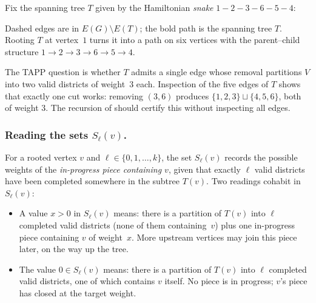 \documentclass[11pt]{article}
\begin{document}
Fix the spanning tree $T$ given by the Hamiltonian \emph{snake}
$1{-}2{-}3{-}6{-}5{-}4$:

\begin{center}
\end{center}

\noindent Dashed edges are in $E(G) \setminus E(T)$; the bold path is
the spanning tree $T$. Rooting $T$ at vertex~$1$ turns it into a path
on six vertices with the parent--child structure
$1 \to 2 \to 3 \to 6 \to 5 \to 4$.

The TAPP question is whether $T$ admits a single edge whose removal
partitions $V$ into two valid districts of weight~$3$ each. Inspection
of the five edges of $T$ shows that exactly one cut works: removing
$(3,6)$ produces $\{1,2,3\} \sqcup \{4,5,6\}$, both of weight $3$. The
recursion of \cite[Theorem~C.10]{akitaya2026bud} should certify this
without inspecting all edges.

\subsubsection*{Reading the sets $S_\ell(v)$.}

For a rooted vertex $v$ and $\ell \in \{0, 1, \ldots, k\}$, the set
$S_\ell(v)$ records the possible weights of the
\emph{in-progress piece containing $v$}, given that exactly $\ell$
valid districts have been completed somewhere in the subtree $T(v)$.
Two readings cohabit in $S_\ell(v)$:

\begin{itemize}
  \item A value $x > 0$ in $S_\ell(v)$ means: there is a partition of
    $T(v)$ into $\ell$ completed valid districts (none of them
    containing~$v$) plus one in-progress piece containing $v$ of
    weight~$x$. More upstream vertices may join this piece later, on
    the way up the tree.
  \item The value $0 \in S_\ell(v)$ means: there is a partition of
    $T(v)$ into $\ell$ completed valid districts, one of which contains
    $v$ itself. No piece is in progress; $v$'s piece has closed at the
    target weight.
\end{itemize}
\end{document}

